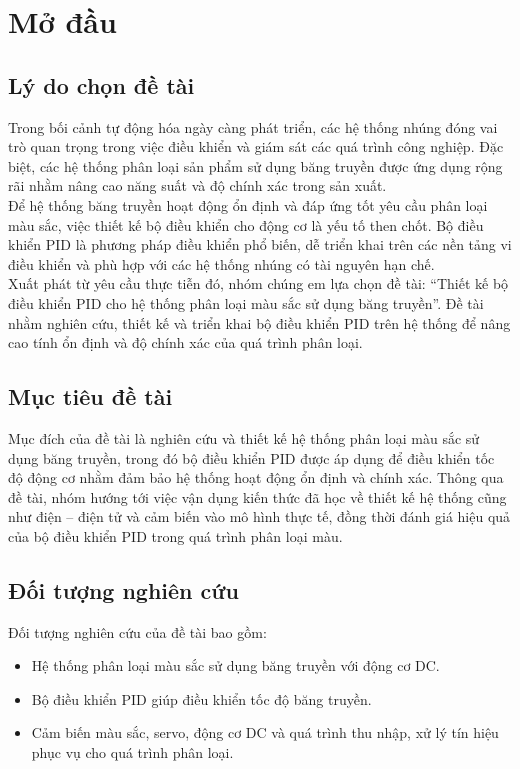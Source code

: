 \chapter{Mở đầu}
\label{chap:chap1-introduce}

\section{Lý do chọn đề tài}

Trong bối cảnh tự động hóa ngày càng phát triển, các hệ thống nhúng đóng vai trò quan trọng trong việc điều khiển và giám sát các quá trình công nghiệp. Đặc biệt, các hệ thống phân loại sản phẩm sử dụng băng truyền được ứng dụng rộng rãi nhằm nâng cao năng suất và độ chính xác trong sản xuất.\\

Để hệ thống băng truyền hoạt động ổn định và đáp ứng tốt yêu cầu phân loại màu sắc, việc thiết kế bộ điều khiển cho động cơ là yếu tố then chốt. Bộ điều khiển PID là phương pháp điều khiển phổ biến, dễ triển khai trên các nền tảng vi điều khiển và phù hợp với các hệ thống nhúng có tài nguyên hạn chế.\\

Xuất phát từ yêu cầu thực tiễn đó, nhóm chúng em lựa chọn đề tài: “Thiết kế bộ điều khiển PID cho hệ thống phân loại màu sắc sử dụng băng truyền”. Đề tài nhằm nghiên cứu, thiết kế và triển khai bộ điều khiển PID trên hệ thống để nâng cao tính ổn định và độ chính xác của quá trình phân loại.

\section{Mục tiêu đề tài}
Mục đích của đề tài là nghiên cứu và thiết kế hệ thống phân loại màu sắc sử dụng băng truyền, trong đó bộ điều khiển PID được áp dụng để điều khiển tốc độ động cơ nhằm đảm bảo hệ thống hoạt động ổn định và chính xác. Thông qua đề tài, nhóm hướng tới việc vận dụng kiến thức đã học về thiết kế hệ thống cũng như điện – điện tử và cảm biến vào mô hình thực tế, đồng thời đánh giá hiệu quả của bộ điều khiển PID trong quá trình phân loại màu.

\section{Đối tượng nghiên cứu}
Đối tượng nghiên cứu của đề tài bao gồm:
\begin{itemize}
    \item Hệ thống phân loại màu sắc sử dụng băng truyền với động cơ DC.
    \item Bộ điều khiển PID giúp điều khiển tốc độ băng truyền.
    \item Cảm biến màu sắc, servo, động cơ DC và quá trình thu nhập, xử lý tín hiệu phục vụ cho quá trình phân loại. 
\end{itemize}

